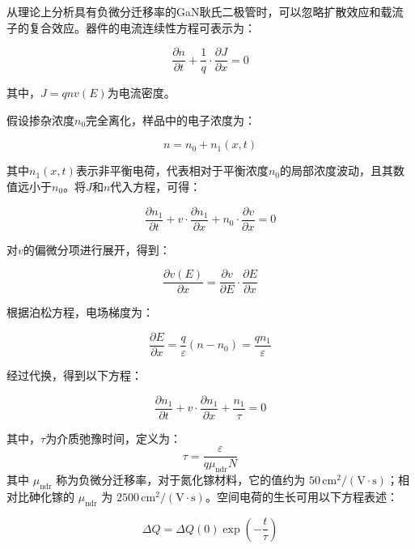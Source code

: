 \documentclass[12pt,hyperref,a4paper,UTF8]{ctexart}
\begin{document}
从理论上分析具有负微分迁移率的GaN耿氏二极管时，可以忽略扩散效应和载流子的复合效应。器件的电流连续性方程可表示为：

\begin{equation}
\frac{\partial n}{\partial t} + \frac{1}{q} \cdot \frac{\partial J}{\partial x} = 0 
\end{equation}

其中，$J = qnv(E)$为电流密度。

假设掺杂浓度$n_0$完全离化，样品中的电子浓度为：

\begin{equation}
n = n_0 + n_1(x, t)
\end{equation}

其中$n_1(x, t)$表示非平衡电荷，代表相对于平衡浓度$n_0$的局部浓度波动，且其数值远小于$n_0$。将$J$和$n$代入方程，可得：

\begin{equation}
\frac{\partial n_1}{\partial t} + v \cdot \frac{\partial n_1}{\partial x} + n_0 \cdot \frac{\partial v}{\partial x} = 0 
\end{equation}

对$v$的偏微分项进行展开，得到：

\begin{equation}
\frac{\partial v(E)}{\partial x} = \frac{\partial v}{\partial E} \cdot \frac{\partial E}{\partial x} 
\end{equation}

根据泊松方程，电场梯度为：

\begin{equation}
\frac{\partial E}{\partial x} = \frac{q}{\varepsilon} (n - n_0) = \frac{qn_1}{\varepsilon} 
\end{equation}

经过代换，得到以下方程：

\begin{equation}
\frac{\partial n_1}{\partial t} + v \cdot \frac{\partial n_1}{\partial x} + \frac{n_1}{\tau} = 0 
\end{equation}

其中，$\tau$为介质弛豫时间，定义为：
\begin{equation}
\tau =  \frac{\varepsilon}{q\mu_{\text{ndr}} N} 
\end{equation}
其中 $\mu_{\text{ndr}}$ 称为负微分迁移率，对于氮化镓材料，它的值约为 $50 \, \text{cm}^2/(\text{V} \cdot \text{s})$；相对比砷化镓的 $\mu_{\text{ndr}}$ 为 $2500 \, \text{cm}^2/(\text{V} \cdot \text{s})$。空间电荷的生长可用以下方程表述：

\begin{equation}
\Delta Q = \Delta Q(0) \exp\left(-\frac{t}{\tau}\right)
\end{equation}
\end{document}

